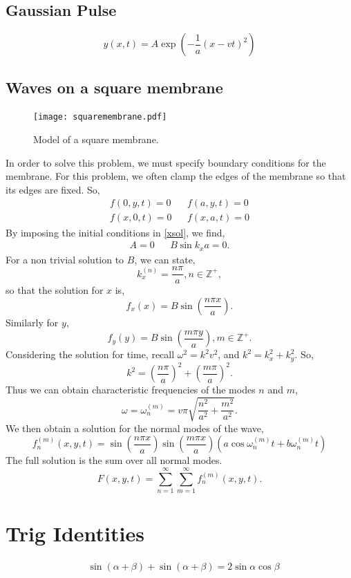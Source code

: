 \documentclass{book}
\begin{document}
\section{Gaussian Pulse}
\begin{equation}
    y(x,t) = A\exp\left(-\frac{1}{a}(x-vt)^2\right)
\end{equation}


\section{Waves on a square membrane}
\begin{figure}[h]
	\centering
	\texttt{[image: squaremembrane.pdf]}
	\caption{Model of a square membrane.}
	\label{squaremembrane}
\end{figure}
In order to solve this problem, we must specify boundary conditions for the membrane. For this problem, we often clamp the edges of the membrane so that its edges are fixed. So,
\begin{align}
	f(0,y,t) = 0 && f(a,y,t) = 0\\
	f(x,0,t) = 0 && f(x,a,t) = 0
\end{align}
By imposing the initial conditions in \eqref{xsol}, we find,
\begin{align}
	A = 0 && B\sin k_xa = 0.
\end{align}
For a non trivial solution to $B$, we can state,
\begin{equation}
	k_x^{(n)} = \frac{n\pi}{a}, n\in \mathbb{Z}^+,
\end{equation}
so that the solution for $x$ is,
\begin{equation}
	f_x(x) = B\sin\left(\frac{n\pi x}{a}\right).
\end{equation}
Similarly for $y$,
\begin{equation}
	f_y(y) = B\sin\left(\frac{m\pi y}{a}\right), m \in \mathbb{Z}^+.
\end{equation}
Considering the solution for time, recall $\omega^2 = k^2v^2$, and $k^2 = k_x^2 + k_y^2$. So,
\begin{equation}
	k^2 = \left(\frac{n\pi}{a}\right)^2 + \left(\frac{m\pi}{a}\right)^2.
\end{equation}
Thus we can obtain characteristic frequencies of the modes $n$ and $m$,
\begin{equation}
	\omega = \omega_n^{(m)} = v\pi\sqrt{\frac{n^2}{a^2} + \frac{m^2}{a^2}}.
\end{equation}
We then obtain a solution for the normal modes of the wave,
\begin{equation}
	f_n^{(m)}(x,y,t) = \sin\left(\frac{n\pi x}{a}\right)\sin\left(\frac{m\pi x}{a}\right)\left(a\cos\omega_n^{(m)}t + b\omega_n^{(m)}t\right)
\end{equation}
The full solution is the sum over all normal modes.
\begin{equation}
	F(x,y,t) = \sum_{n=1}^{\infty}\sum_{m=1}^{\infty}f_n^{(m)}(x,y,t).
\end{equation}
\chapter{Trig Identities}
\begin{align}
	& \sin(\alpha + \beta) + \sin(\alpha + \beta) = 2\sin\alpha\cos\beta \label{id1}
\end{align}
\end{document}

